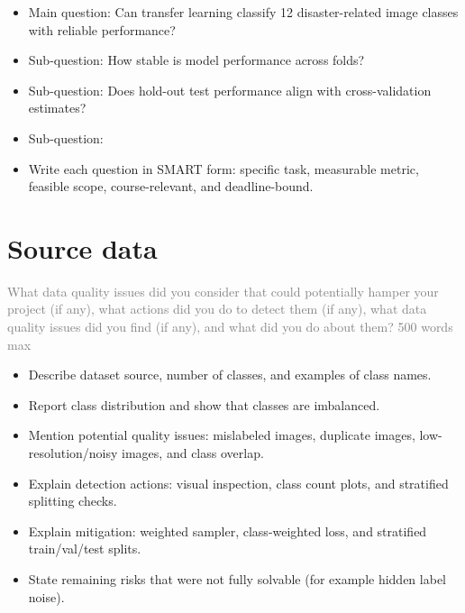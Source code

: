 \documentclass{article}
\begin{document}


\begin{itemize}
    \item Main question: Can transfer learning classify 12 disaster-related image classes with reliable performance?
    \item Sub-question: How stable is model performance across folds?
    \item Sub-question: Does hold-out test performance align with cross-validation estimates?
    \item Sub-question: 
    \item Write each question in SMART form: specific task, measurable metric, feasible scope, course-relevant, and deadline-bound.
\end{itemize}

\section{Source data}
\textcolor{gray}{What data quality issues did you consider that could potentially hamper your project (if any), what actions did you do to detect them (if any), what data quality issues did you find (if any), and what did you do about them? 500 words max}

\begin{itemize}
    \item Describe dataset source, number of classes, and examples of class names.
    \item Report class distribution and show that classes are imbalanced.
    \item Mention potential quality issues: mislabeled images, duplicate images, low-resolution/noisy images, and class overlap.
    \item Explain detection actions: visual inspection, class count plots, and stratified splitting checks.
    \item Explain mitigation: weighted sampler, class-weighted loss, and stratified train/val/test splits.
    \item State remaining risks that were not fully solvable (for example hidden label noise).
\end{itemize}
\end{document}

